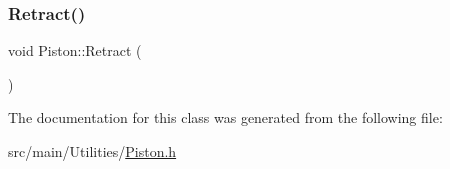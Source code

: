 \mbox{\label{classPiston_a37038045cb847723f935f625f4ff6d84}} 
\subsubsection{\texorpdfstring{Retract()}{Retract()}}
{\footnotesize\ttfamily void Piston\+::\+Retract (\begin{DoxyParamCaption}{ }\end{DoxyParamCaption})\hspace{0.3cm}{\ttfamily [inline]}}



The documentation for this class was generated from the following file\+:\begin{DoxyCompactItemize}
\item 
src/main/\+Utilities/\hyperlink{Piston_8h}{Piston.\+h}\end{DoxyCompactItemize}
